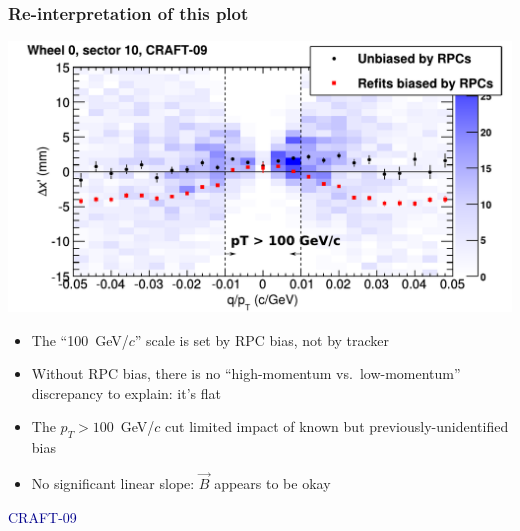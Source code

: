\documentclass[compress]{beamer}
\begin{document}
\begin{frame}
\frametitle{Re-interpretation of this plot}

\begin{center}
\includegraphics[width=0.75\linewidth]{globaldistort_compare.pdf}
\end{center}
\begin{itemize}
\item The ``100~GeV/$c$'' scale is set by RPC bias, not by tracker

\item Without RPC bias, there is no ``high-momentum
  vs.\ low-momentum'' discrepancy to explain: it's flat

\item The $p_T > 100$~GeV/$c$ cut limited impact of known but previously-unidentified bias

\item No significant linear slope: $\vec{B}$ appears to be okay
\end{itemize}

\vspace{-0.5 cm}
\hfill \textcolor{darkblue}{\scriptsize CRAFT-09}

\vspace{0.25 cm}
\end{frame}
\end{document}
